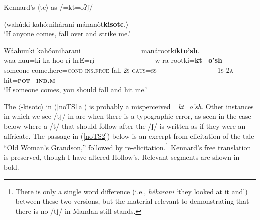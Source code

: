 \begin{exe}
\item\label{noTS1} Kennard's $\langle$tc$\rangle$ as /=kt=oʔʃ/

	\begin{xlist}

	\item\label{noTS1a} $\langle$wahú:ki kahó:nihàrani mánanòt\textbf{kisotc}.$\rangle$\\
			`If anyone comes, fall over and strike me.' \citep[257]{kennard1934}

\item\label{noTS1b}
				\glll	Wáahuuki kahóoniharani ~ ~ ~ ~ ~ ~ ~ ~ ~ ~ manárootki\textbf{kto'sh}.\\
				waa-huu=ki ka-hoo-rį-hrE=rį ~ ~ ~ ~ ~ ~ ~ ~ ~ ~ w-ra-rootki=\textbf{kt=o'sh}\\
				\textnormal{someone}-\textnormal{come.here}=\textsc{cond} \textsc{ins.frce}-\textnormal{fall}-\textsc{2s-caus=ss} ~ ~ ~ ~ ~ ~ ~ ~ ~ ~ \textsc{1s-2a}-\textnormal{hit}=\textsc{\textbf{pot=ind.m}}\\
				\glt	`If someone comes, you should fall and hit me.' \citep[62]{hollow1973b}

	\end{xlist}

\end{exe}

The $\langle$-kisotc$\rangle$ in (\ref{noTS1a}) is probably a misperceived \textit{=kt=o'sh}. Other instances in which we see /tʃ/ in \citet{kennard1934} are when there is a typographic error, as seen in the case below where a /t/ that should follow after the /ʃ/ is written as if they were an affricate. The passage in (\ref{noTS2}) below is an excerpt from  elicitation of the tale ``Old Woman's Grandson,'' followed by  re-elicitation.\footnote{There is only a single word difference (i.e., \textit{hékarani} `they looked at it and') between these two versions, but the material relevant to demonstrating that there is no /tʃ/ in Mandan still stands.} Kennard's free translation is preserved, though I have altered Hollow's. Relevant segments are shown in bold.

